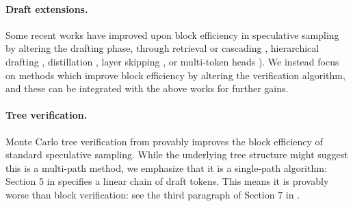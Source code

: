 \documentclass{article}
\theoremstyle{plain}
\theoremstyle{definition}
\theoremstyle{remark}
\begin{document}
\paragraph{Draft extensions.} Some recent works have improved upon block efficiency in speculative sampling by altering the drafting phase, through retrieval or cascading \citep{he2023rest,chen2024cascade}, hierarchical drafting \citep{sun2024triforce}, distillation \citep{zhou2023distillspec,liu2023online}, layer skipping \citep{zhang2023draft,elhoushi2024layerskip}, or multi-token heads \citep{gloeckle2024better,samragh2025your}). We instead focus on methods which improve block efficiency by altering the verification algorithm, and these can be integrated with the above works for further gains.

\paragraph{Tree verification.} Monte Carlo tree verification from \citet{hu2024accelerated} provably improves the block efficiency of standard speculative sampling. While the underlying tree structure might suggest this is a multi-path method, we emphasize that it is a single-path algorithm: Section 5 in \citet{hu2024accelerated} specifies a linear chain of draft tokens. This means it is provably worse than block verification: see the third paragraph of Section 7 in \citet{sun2024block}. 
\end{document}
